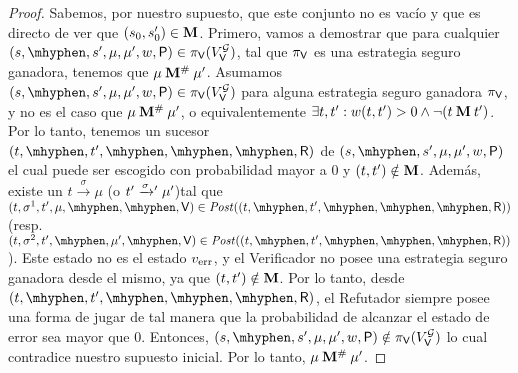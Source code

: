 \begin{proof}
Sabemos, por nuestro supuesto, que este conjunto no es vacío y que es directo de ver que $(s_0,s'_0) \in \mathbin{\mathbf{M}}$. 
Primero, vamos a demostrar que para cualquier $(s, \mhyphen, s', \mu, \mu', w, \Probabilistic) \in \strat{\Verifier}(V^{\StochG}_\Verifier)$,  tal que   $\pi_{\mathsf{V}}$ es una estrategia seguro ganadora,  
tenemos que  $\mu \mathbin{\mathbf{M^{\#}}} \mu'$. 
Asumamos $(s, \mhyphen, s', \mu, \mu', w, \Probabilistic) \in \strat{\Verifier}(V^{\StochG}_\Verifier)$ para alguna estrategia seguro ganadora $\pi_{\mathsf{V}}$, y no es el caso que $\mu \mathbin{\mathbf{M^{\#}}} \mu'$, o equivalentemente 
$\exists t,t' : w(t,t') > 0 \wedge \neg (t \mathbin{\mathbf{M}} t')$. 
Por lo tanto, tenemos un sucesor $(t, \mhyphen,t', \mhyphen,\mhyphen,\mhyphen, \Refuter)$ de
$(s, \mhyphen, s', \mu, \mu', w, \Probabilistic)$ el cual puede ser escogido con probabilidad mayor a $0$ y  $(t,t') \notin \mathbin{\mathbf{M}}$. 
Además, existe un $t \xrightarrow{\sigma} \mu$ 
(o $t' \mathrel{{\xrightarrow[]{\sigma}}{}'} \mu'$)tal que $(t, \sigma^1, t', \mu, \mhyphen, \mhyphen, \Verifier) \in \post((t, \mhyphen,t', \mhyphen,\mhyphen,\mhyphen, \Refuter))$ 
(resp. $(t, \sigma^2, t', \mhyphen,  \mu', \mhyphen, \Verifier) \in \post((t, \mhyphen,t', \mhyphen,\mhyphen,\mhyphen, \Refuter))$). 
Este estado no es el estado $v_{\text{err}}$, y el Verificador no posee una estrategia seguro ganadora desde el mismo, ya que $(t,t') \notin \mathbin{\mathbf{M}}$.  Por lo tanto,  desde 
$(t, \mhyphen,t', \mhyphen,\mhyphen,\mhyphen, \Refuter)$, el Refutador siempre posee una forma de jugar de tal manera que la probabilidad de alcanzar el estado de error sea mayor que $0$.  Entonces, 
$(s, \mhyphen, s', \mu, \mu', w, \Probabilistic) \notin \strat{\Verifier}(V^{\StochG}_\Verifier)$ lo cual contradice nuestro supuesto inicial. 
Por lo tanto, $\mu \mathbin{\mathbf{M^{\#}}} \mu'$.


\end{proof}
